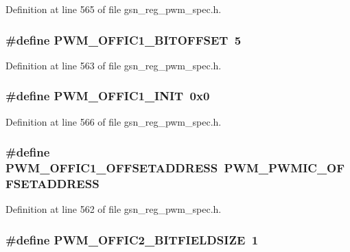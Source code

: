 Definition at line 565 of file gsn\_\-reg\_\-pwm\_\-spec.h.

\hypertarget{a00565_a25bb383aa09d4f5b7c9a2bf36749de18}{
\subsubsection[{PWM\_\-OFFIC1\_\-BITOFFSET}]{\setlength{\rightskip}{0pt plus 5cm}\#define PWM\_\-OFFIC1\_\-BITOFFSET~5}}
\label{a00565_a25bb383aa09d4f5b7c9a2bf36749de18}


Definition at line 563 of file gsn\_\-reg\_\-pwm\_\-spec.h.

\hypertarget{a00565_a741fd8a2002de1bbedde6b605b932db3}{
\subsubsection[{PWM\_\-OFFIC1\_\-INIT}]{\setlength{\rightskip}{0pt plus 5cm}\#define PWM\_\-OFFIC1\_\-INIT~0x0}}
\label{a00565_a741fd8a2002de1bbedde6b605b932db3}


Definition at line 566 of file gsn\_\-reg\_\-pwm\_\-spec.h.

\hypertarget{a00565_a688d14f7269cbf615626d282e6723295}{
\subsubsection[{PWM\_\-OFFIC1\_\-OFFSETADDRESS}]{\setlength{\rightskip}{0pt plus 5cm}\#define PWM\_\-OFFIC1\_\-OFFSETADDRESS~PWM\_\-PWMIC\_\-OFFSETADDRESS}}
\label{a00565_a688d14f7269cbf615626d282e6723295}


Definition at line 562 of file gsn\_\-reg\_\-pwm\_\-spec.h.

\hypertarget{a00565_ac5e73d679bc421137b94da4c343ce3c8}{
\subsubsection[{PWM\_\-OFFIC2\_\-BITFIELDSIZE}]{\setlength{\rightskip}{0pt plus 5cm}\#define PWM\_\-OFFIC2\_\-BITFIELDSIZE~1}}
\label{a00565_ac5e73d679bc421137b94da4c343ce3c8}


